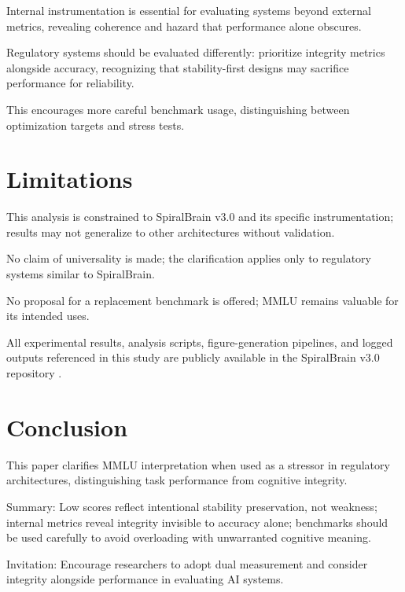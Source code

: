 \documentclass[12pt,a4paper]{report}
\begin{document}
Internal instrumentation is essential for evaluating systems beyond external metrics, revealing coherence and hazard that performance alone obscures.

Regulatory systems should be evaluated differently: prioritize integrity metrics alongside accuracy, recognizing that stability-first designs may sacrifice performance for reliability.

This encourages more careful benchmark usage, distinguishing between optimization targets and stress tests.

\section{Limitations}

This analysis is constrained to SpiralBrain v3.0 and its specific instrumentation; results may not generalize to other architectures without validation.

No claim of universality is made; the clarification applies only to regulatory systems similar to SpiralBrain.

No proposal for a replacement benchmark is offered; MMLU remains valuable for its intended uses.

All experimental results, analysis scripts, figure-generation pipelines, and logged outputs referenced in this study are publicly available in the SpiralBrain v3.0 repository \cite{SpiralBrainRepo}.

\section{Conclusion}

This paper clarifies MMLU interpretation when used as a stressor in regulatory architectures, distinguishing task performance from cognitive integrity.

Summary: Low scores reflect intentional stability preservation, not weakness; internal metrics reveal integrity invisible to accuracy alone; benchmarks should be used carefully to avoid overloading with unwarranted cognitive meaning.

Invitation: Encourage researchers to adopt dual measurement and consider integrity alongside performance in evaluating AI systems.



\end{document}
